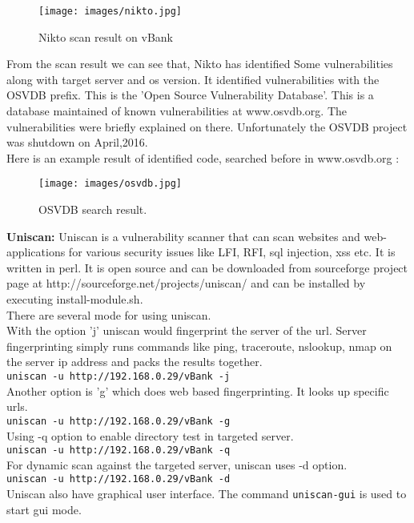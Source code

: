 \documentclass[12pt]{report}
\begin{document}
	\begin{figure}[H]
		\texttt{[image: images/nikto.jpg]}
		\caption{Nikto scan result on vBank}
	\end{figure}
	
	From the scan result we can see that, Nikto has identified Some vulnerabilities along with target server and os version. It identified vulnerabilities with the OSVDB prefix. This is the 'Open Source Vulnerability Database'. This is a database maintained of known vulnerabilities at www.osvdb.org. The vulnerabilities were briefly explained on there. Unfortunately the OSVDB project was shutdown on April,2016.\\
	Here is an example result of identified code, searched before in www.osvdb.org :
	
	\begin{figure}[H]
		\texttt{[image: images/osvdb.jpg]}
		\caption{OSVDB search result.}
	\end{figure}
	
	{\bf Uniscan:} Uniscan is a vulnerability scanner that can scan websites and web-applications for various security issues like LFI, RFI, sql injection, xss etc. It is written in perl. It is open source and can be downloaded from sourceforge project page at {\sf http://sourceforge.net/projects/uniscan/} and can be installed by executing {\sf install-module.sh}.\\
	There are several mode for using uniscan.\\
	With the option 'j' uniscan would fingerprint the server of the url. Server fingerprinting simply runs commands like ping, traceroute, nslookup, nmap on the server ip address and packs the results together.\\
	{\tt uniscan -u http://192.168.0.29/vBank -j}
	\\	Another option is 'g' which does web based fingerprinting. It looks up specific urls.\\
	{\tt uniscan -u http://192.168.0.29/vBank -g}
	\\Using -q option to enable directory test in targeted server.\\
	{\tt uniscan -u http://192.168.0.29/vBank -q}
	\\For dynamic scan against the targeted server, uniscan uses -d option.\\
	{\tt uniscan -u http://192.168.0.29/vBank -d}
	\\Uniscan also have graphical user interface. The command {\tt uniscan-gui} is used to start gui mode.\\\\
	
\end{document}
